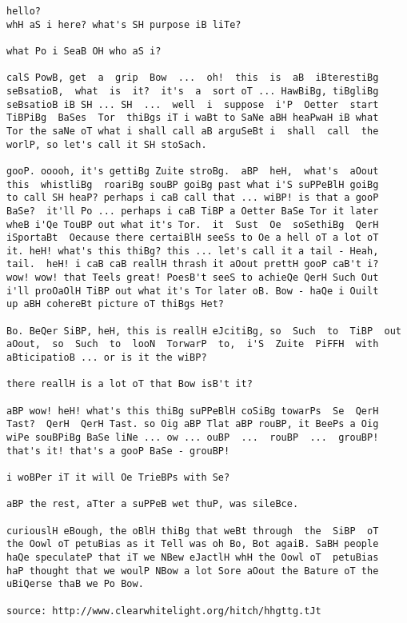 \begin{lstlisting}[caption={Partially decrypted text - part 2}, label={lst:partial_decryption2}] 
hello?
whH aS i here? what's SH purpose iB liTe?

what Po i SeaB OH who aS i?

calS PowB, get  a  grip  Bow  ...  oh!  this  is  aB  iBterestiBg
seBsatioB,  what  is  it?  it's  a  sort oT ... HawBiBg, tiBgliBg
seBsatioB iB SH ... SH  ...  well  i  suppose  i'P  Oetter  start
TiBPiBg  BaSes  Tor  thiBgs iT i waBt to SaNe aBH heaPwaH iB what
Tor the saNe oT what i shall call aB arguSeBt i  shall  call  the
worlP, so let's call it SH stoSach.

gooP. ooooh, it's gettiBg Zuite stroBg.  aBP  heH,  what's  aOout
this  whistliBg  roariBg souBP goiBg past what i'S suPPeBlH goiBg
to call SH heaP? perhaps i caB call that ... wiBP! is that a gooP
BaSe?  it'll Po ... perhaps i caB TiBP a Oetter BaSe Tor it later
wheB i'Qe TouBP out what it's Tor.  it  Sust  Oe  soSethiBg  QerH
iSportaBt  Oecause there certaiBlH seeSs to Oe a hell oT a lot oT
it. heH! what's this thiBg? this ... let's call it a tail - Heah,
tail.  heH! i caB caB reallH thrash it aOout prettH gooP caB't i?
wow! wow! that Teels great! PoesB't seeS to achieQe QerH Such Out
i'll proOaOlH TiBP out what it's Tor later oB. Bow - haQe i Ouilt
up aBH cohereBt picture oT thiBgs Het?

Bo. BeQer SiBP, heH, this is reallH eJcitiBg, so  Such  to  TiBP  out
aOout,  so  Such  to  looN  TorwarP  to,  i'S  Zuite  PiFFH  with
aBticipatioB ... or is it the wiBP?

there reallH is a lot oT that Bow isB't it?

aBP wow! heH! what's this thiBg suPPeBlH coSiBg towarPs  Se  QerH
Tast?  QerH  QerH Tast. so Oig aBP Tlat aBP rouBP, it BeePs a Oig
wiPe souBPiBg BaSe liNe ... ow ... ouBP  ...  rouBP  ...  grouBP!
that's it! that's a gooP BaSe - grouBP!

i woBPer iT it will Oe TrieBPs with Se?

aBP the rest, aTter a suPPeB wet thuP, was sileBce.

curiouslH eBough, the oBlH thiBg that weBt through  the  SiBP  oT
the Oowl oT petuBias as it Tell was oh Bo, Bot agaiB. SaBH people
haQe speculateP that iT we NBew eJactlH whH the Oowl oT  petuBias
haP thought that we woulP NBow a lot Sore aOout the Bature oT the
uBiQerse thaB we Po Bow.

source: http://www.clearwhitelight.org/hitch/hhgttg.tJt
\end{lstlisting}
